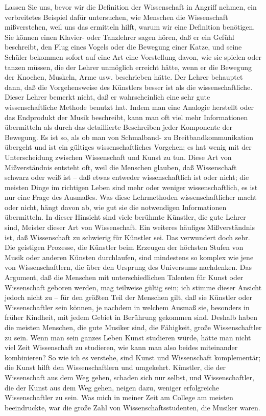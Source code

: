 Lassen Sie uns, bevor wir die Definition der Wissenschaft in Angriff nehmen, ein verbreitetes Beispiel dafür untersuchen, wie Menschen die Wissenschaft mißverstehen, weil uns das ermitteln hilft, warum wir eine Definition benötigen.
Sie können einen Klavier- oder Tanzlehrer sagen hören, daß er ein Gefühl beschreibt, den Flug eines Vogels oder die Bewegung einer Katze, und seine Schüler bekommen sofort auf eine Art eine Vorstellung davon, wie sie spielen oder tanzen müssen, die der Lehrer unmöglich erreicht hätte, wenn er die Bewegung der Knochen, Muskeln, Arme usw. beschrieben hätte.
Der Lehrer behauptet dann, daß die Vorgehensweise des Künstlers besser ist als die wissenschaftliche.
Dieser Lehrer bemerkt nicht, daß er wahrscheinlich eine sehr gute wissenschaftliche Methode benutzt hat.
Indem man eine Analogie herstellt oder das Endprodukt der Musik beschreibt, kann man oft viel mehr Informationen übermitteln als durch das detaillierte Beschreiben jeder Komponente der Bewegung.
Es ist so, als ob man von Schmalband- zu Breitbandkommunikation übergeht und ist ein gültiges wissenschaftliches Vorgehen; es hat wenig mit der Unterscheidung zwischen Wissenschaft und Kunst zu tun.
Diese Art von Mißverständnis entsteht oft, weil die Menschen glauben, daß Wissenschaft schwarz oder weiß ist -- daß etwas entweder wissenschaftlich ist oder nicht; die meisten Dinge im richtigen Leben sind mehr oder weniger wissenschaftlich, es ist nur eine Frage des Ausmaßes.
Was diese Lehrmethoden wissenschaftlicher macht oder nicht, hängt davon ab, wie gut sie die notwendigen Informationen übermitteln.
In dieser Hinsicht sind viele berühmte Künstler, die gute Lehrer sind, Meister dieser Art von Wissenschaft.
Ein weiteres häufiges Mißverständnis ist, daß Wissenschaft zu schwierig für Künstler sei.
Das verwundert doch sehr.
Die geistigen Prozesse, die Künstler beim Erzeugen der höchsten Stufen von Musik oder anderen Künsten durchlaufen, sind mindestens so komplex wie jene von Wissenschaftlern, die über den Ursprung des Universums nachdenken.
Das Argument, daß die Menschen mit unterschiedlichen Talenten für Kunst oder Wissenschaft geboren werden, mag teilweise gültig sein; ich stimme dieser Ansicht jedoch nicht zu -- für den größten Teil der Menschen gilt, daß sie Künstler oder Wissenschaftler sein können, je nachdem in welchem Ausmaß sie, besonders in früher Kindheit, mit jedem Gebiet in Berührung gekommen sind.
Deshalb haben die meisten Menschen, die gute Musiker sind, die Fähigkeit, große Wissenschaftler zu sein.
Wenn man sein ganzes Leben Kunst studieren würde, hätte man nicht viel Zeit Wissenschaft zu studieren, wie kann man also beides miteinander kombinieren?
So wie ich es verstehe, sind Kunst und Wissenschaft komplementär; die Kunst hilft den Wissenschaftlern und umgekehrt.
Künstler, die der Wissenschaft aus dem Weg gehen, schaden sich nur selbst, und Wissenschaftler, die der Kunst aus dem Weg gehen, neigen dazu, weniger erfolgreiche Wissenschaftler zu sein.
Was mich in meiner Zeit am College am meisten beeindruckte, war die große Zahl von Wissenschaftsstudenten, die Musiker waren.
 


